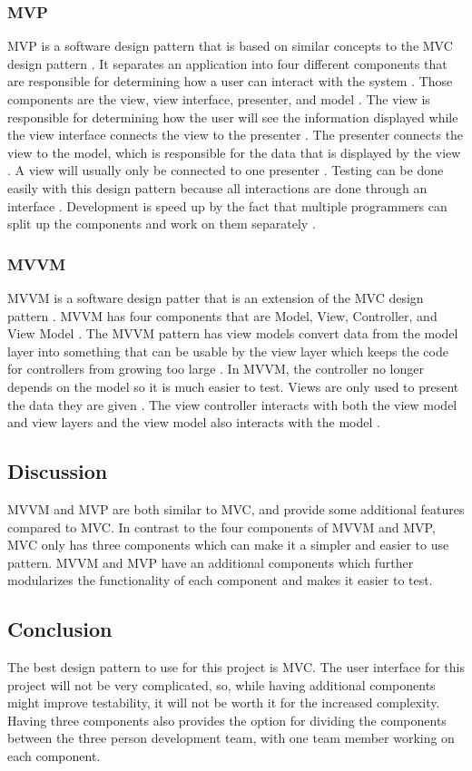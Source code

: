 \documentclass[onecolumn, draftclsnofoot,10pt, compsoc]{IEEEtran}
\begin{document}
\subsubsection{MVP}
MVP is a software design pattern that is based on similar concepts to the MVC design pattern \cite{mvp}. It separates an application into four different components that are responsible for determining how a user can interact with the system \cite{mvp}. Those components are the view, view interface, presenter, and model \cite{mvp}. The view is responsible for determining how the user will see the information displayed while the view interface connects the view to the presenter \cite{mvp}. The presenter connects the view to the model, which is responsible for the data that is displayed by the view \cite{mvp}. A view will usually only be connected to one presenter \cite{mvp}. Testing can be done easily with this design pattern because all interactions are done through an interface \cite{mvp}. Development is speed up by the fact that multiple programmers can split up the components and work on them separately \cite{mvp}.

\subsubsection{MVVM}
MVVM is a software design patter that is an extension of the MVC design pattern \cite{mvvm}. MVVM has four components that are Model, View, Controller, and View Model \cite{mvvm}. The MVVM pattern has view models convert data from the model layer into something that can be usable by the view layer which keeps the code for controllers from growing too large \cite{mvvm}. In MVVM, the controller no longer depends on the model so it is much easier to test. Views are only used to present the data they are given \cite{mvvm}. The view controller interacts with both the view model and view layers and the view model also interacts with the model \cite{mvvm}.

\subsection{Discussion}
MVVM and MVP are both similar to MVC, and provide some additional features compared to MVC. In contrast to the four components of MVVM and MVP, MVC only has three components which can make it a simpler and easier to use pattern. MVVM and MVP have an additional components which further modularizes the functionality of each component and makes it easier to test.

\subsection{Conclusion}
The best design pattern to use for this project is MVC. The user interface for this project will not be very complicated, so, while having additional components might improve testability, it will not be worth it for the increased complexity. Having three components also provides the option for dividing the components between the three person development team, with one team member working on each component.

\newpage


\end{document}
